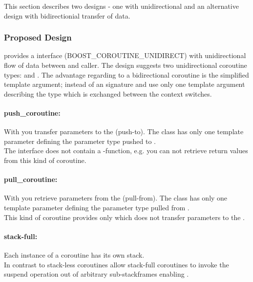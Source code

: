 This section describes two designs - one with unidirectional and an alternative
design with bidirectionial transfer of data.\\

\subsubsection*{Proposed Design}
\boostcoroutine provides a interface (BOOST_COROUTINE_UNIDIRECT) with
unidirectional flow of data between \corofunction and caller.
The design suggests two unidirectional coroutine types: \pushcoro and
\pullcoro.
The advantage regarding to a bidirectional coroutine is the simplified template
argument; instead of an signature \pullcoro and \pushcoro use only one template
argument describing the type which is exchanged between the context switches.

\paragraph*{push\_coroutine:}
With \pushcoro you transfer parameters to the \corofunction (push-to). The
class has only one template parameter defining the parameter type pushed to
\corofunction.\\
\newline
The interface does not contain a -function, e.g. you can not retrieve
return values from this kind of coroutine.

\paragraph*{pull\_coroutine:}
With \pullcoro you retrieve parameters from the \corofunction (pull-from). The
class has only one template parameter defining the parameter type pulled from
\corofunction.\\
\newline
This kind of coroutine provides only \pullcoroop which does not transfer
parameters to the \corofunction.

\paragraph*{stack-full:}
Each instance of a coroutine has its own stack.\\
\newline
In contrast to stack-less coroutines allow stack-full coroutines to invoke the
suspend operation out of arbitrary sub-stackframes enabling \escreops.

